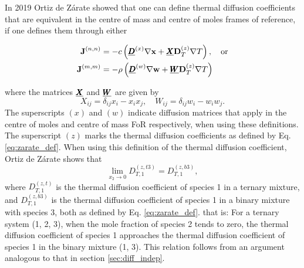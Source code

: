 In 2019 Ortiz de Zárate \cite{ortiz2019definition} showed that one can define thermal diffusion coefficients that are equivalent in the centre of mass and centre of moles frames of reference, if one defines them through either

\begin{equation}
    \begin{split}
        \boldsymbol{\mathrm{J}}^{(n, n)} &= - c \left( \underline{\pmb{D}}^{(x)} \nabla \boldsymbol{\mathrm{x}} + \underline{\pmb{X}} \boldsymbol{\mathrm{D}}_T^{(z)} \nabla T \right), \quad \text{or}\\
        \boldsymbol{\mathrm{J}}^{(m, m)} &= - \rho \left( \underline{\pmb{D}}^{(w)} \nabla \boldsymbol{\mathrm{w}} + \underline{\pmb{W}} \boldsymbol{\mathrm{D}}_T^{(z)} \nabla T \right)
    \end{split}
    \label{eq:zarate_def}
\end{equation}

where the matrices $\underline{\pmb{X}}$ and $\underline{\pmb{W}}$ are given by
\begin{equation}
    X_{ij} = \delta_{ij} x_i - x_i x_j, \quad W_{ij} = \delta_{ij} w_i - w_i w_j.
\end{equation}
The superscripts $(x)$ and $(w)$ indicate diffusion matrices that apply in the centre of moles and centre of mass FoR respectively, when using these definitions. The superscript $(z)$ marks the thermal diffusion coefficients as defined by Eq. \eqref{eq:zarate_def}. When using this definition of the thermal diffusion coefficient, Ortiz de Zárate shows that 
\begin{equation}
    \lim_{x_2 \to 0} D_{T,1}^{(z,t3)} = D_{T,1}^{(z,b3)},
\end{equation}
where $D_{T,1}^{(z,t)}$ is the thermal diffusion coefficient of species 1 in a ternary mixture, and $D_{T,1}^{(z,b3)}$ is the thermal diffusion coefficient of species 1 in a binary mixture with species 3, both as defined by Eq. \eqref{eq:zarate_def}.
that is: For a ternary system (1, 2, 3), when the mole fraction of species 2 tends to zero, the thermal diffusion coefficient of species 1 approaches the thermal diffusion coefficient of species 1 in the binary mixture (1, 3). This relation follows from an argument analogous to that in section \ref{sec:diff_indep}.


